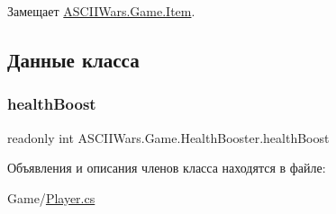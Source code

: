Замещает \hyperlink{class_a_s_c_i_i_wars_1_1_game_1_1_item_a52412546f837bfc65a3aa9d728fa142f}{A\+S\+C\+I\+I\+Wars.\+Game.\+Item}.



\subsection{Данные класса}
\hypertarget{class_a_s_c_i_i_wars_1_1_game_1_1_health_booster_abd6f83cc8e561198c5939ba4a20fd826}{}\label{class_a_s_c_i_i_wars_1_1_game_1_1_health_booster_abd6f83cc8e561198c5939ba4a20fd826} 
\subsubsection{\texorpdfstring{health\+Boost}{healthBoost}}
{\footnotesize\ttfamily readonly int A\+S\+C\+I\+I\+Wars.\+Game.\+Health\+Booster.\+health\+Boost}



Объявления и описания членов класса находятся в файле\+:\begin{DoxyCompactItemize}
\item 
Game/\hyperlink{_player_8cs}{Player.\+cs}\end{DoxyCompactItemize}
